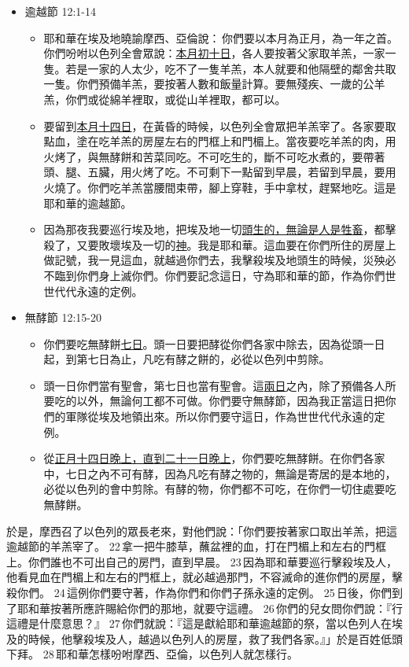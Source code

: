 \begin{itemize} 
\itemsep-.35em 
\item 逾越節 12:1-14
\begin{itemize} 
\itemsep-.35em 
\item 耶和華在埃及地曉諭摩西、亞倫說： 你們要以本月為正月，為一年之首。你們吩咐以色列全會眾說：\underline{本月初十日}，各人要按著父家取羊羔，一家一隻。若是一家的人太少，吃不了一隻羊羔，本人就要和他隔壁的鄰舍共取一隻。你們預備羊羔，要按著人數和飯量計算。要無殘疾、一歲的公羊羔，你們或從綿羊裡取，或從山羊裡取，都可以。 
\item 要留到\underline{本月十四日}，在黃昏的時候，以色列全會眾把羊羔宰了。各家要取點血，塗在吃羊羔的房屋左右的門框上和門楣上。當夜要吃羊羔的肉，用火烤了，與無酵餅和苦菜同吃。不可吃生的，斷不可吃水煮的，要帶著頭、腿、五臟，用火烤了吃。不可剩下一點留到早晨，若留到早晨，要用火燒了。你們吃羊羔當腰間束帶，腳上穿鞋，手中拿杖，趕緊地吃。這是耶和華的逾越節。 
\item 因為那夜我要巡行埃及地，把埃及地一切\underline{頭生的，無論是人是牲畜}，都擊殺了，又要敗壞埃及一切的\underline{神}。我是耶和華。這血要在你們所住的房屋上做記號，我一見這血，就越過你們去，我擊殺埃及地頭生的時候，災殃必不臨到你們身上滅你們。你們要記念這日，守為耶和華的節，作為你們世世代代永遠的定例。
\end{itemize}
\item 無酵節 12:15-20
\begin{itemize} 
\itemsep-.35em 
\item 你們要吃無酵餅\underline{七日}。頭一日要把酵從你們各家中除去，因為從頭一日起，到第七日為止，凡吃有酵之餅的，必從以色列中剪除。 
\item 頭一日你們當有聖會，第七日也當有聖會。這\underline{兩日}之內，除了預備各人所要吃的以外，無論何工都不可做。你們要守無酵節，因為我正當這日把你們的軍隊從埃及地領出來。所以你們要守這日，作為世世代代永遠的定例。 
\item 從\underline{正月十四日晚上，直到二十一日晚上}，你們要吃無酵餅。在你們各家中，七日之內不可有酵，因為凡吃有酵之物的，無論是寄居的是本地的，必從以色列的會中剪除。有酵的物，你們都不可吃，在你們一切住處要吃無酵餅。
\end{itemize}
\end{itemize}

於是，摩西召了以色列的眾長老來，對他們說：「你們要按著家口取出羊羔，把這逾越節的羊羔宰了。 22 拿一把牛膝草，蘸盆裡的血，打在門楣上和左右的門框上。你們誰也不可出自己的房門，直到早晨。 23 因為耶和華要巡行擊殺埃及人，他看見血在門楣上和左右的門框上，就必越過那門，不容滅命的進你們的房屋，擊殺你們。 24 這例你們要守著，作為你們和你們子孫永遠的定例。 25 日後，你們到了耶和華按著所應許賜給你們的那地，就要守這禮。 26 你們的兒女問你們說：『行這禮是什麼意思？』 27 你們就說：『這是獻給耶和華逾越節的祭，當以色列人在埃及的時候，他擊殺埃及人，越過以色列人的房屋，救了我們各家。』」於是百姓低頭下拜。 28 耶和華怎樣吩咐摩西、亞倫，以色列人就怎樣行。

